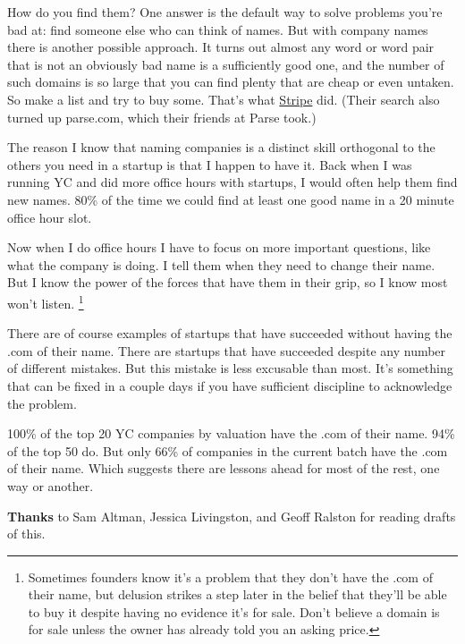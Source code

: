 How do you find them? One answer is the default way to solve problems
you're bad at: find someone else who can think of names. But with
company names there is another possible approach. It turns out almost
any word or word pair that is not an obviously bad name is a
sufficiently good one, and the number of such domains is so large that
you can find plenty that are cheap or even untaken. So make a list and
try to buy some. That's what
\href{http://www.quora.com/How-did-Stripe-come-up-with-its-name?share=1}{Stripe}
did. (Their search also turned up parse.com, which their friends at
Parse took.)

The reason I know that naming companies is a distinct skill orthogonal
to the others you need in a startup is that I happen to have it. Back
when I was running YC and did more office hours with startups, I would
often help them find new names. 80\% of the time we could find at least
one good name in a 20 minute office hour slot.

Now when I do office hours I have to focus on more important questions,
like what the company is doing. I tell them when they need to change
their name. But I know the power of the forces that have them in their
grip, so I know most won't listen. \footnote{Sometimes founders know it's a problem that they don't have the
.com of their name, but delusion strikes a step later in the belief that
they'll be able to buy it despite having no evidence it's for sale.
Don't believe a domain is for sale unless the owner has already told you
an asking price.}

There are of course examples of startups that have succeeded without
having the .com of their name. There are startups that have succeeded
despite any number of different mistakes. But this mistake is less
excusable than most. It's something that can be fixed in a couple days
if you have sufficient discipline to acknowledge the problem.

100\% of the top 20 YC companies by valuation have the .com of their
name. 94\% of the top 50 do. But only 66\% of companies in the current
batch have the .com of their name. Which suggests there are lessons
ahead for most of the rest, one way or another.


\textbf{Thanks} to Sam Altman, Jessica Livingston, and Geoff Ralston for
reading drafts of this.